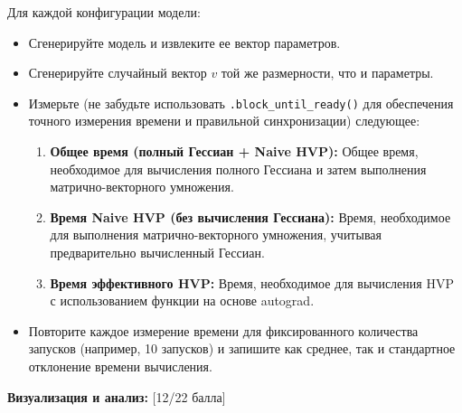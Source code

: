 \documentclass[
  russian,
  letterpaper,
  DIV=11,
  numbers=noendperiod]{scrartcl}
\providecommand{\tightlist}{%
  \setlength{\itemsep}{0pt}\setlength{\parskip}{0pt}}
\begin{document}
\begin{enumerate}
  Для каждой конфигурации модели:

  \begin{itemize}
  \tightlist
  \item
    Сгенерируйте модель и извлеките ее вектор параметров.
  \item
    Сгенерируйте случайный вектор \(v\) той же размерности, что и
    параметры.
  \item
    Измерьте (не забудьте использовать \texttt{.block\_until\_ready()}
    для обеспечения точного измерения времени и правильной
    синхронизации) следующее:

    \begin{enumerate}
    \def\labelenumii{\arabic{enumii}.}
    \tightlist
    \item
      \textbf{Общее время (полный Гессиан + Naive HVP):} Общее время,
      необходимое для вычисления полного Гессиана и затем выполнения
      матрично-векторного умножения.
    \item
      \textbf{Время Naive HVP (без вычисления Гессиана):} Время,
      необходимое для выполнения матрично-векторного умножения, учитывая
      предварительно вычисленный Гессиан.
    \item
      \textbf{Время эффективного HVP:} Время, необходимое для вычисления
      HVP с использованием функции на основе autograd.
    \end{enumerate}
  \item
    Повторите каждое измерение времени для фиксированного количества
    запусков (например, 10 запусков) и запишите как среднее, так и
    стандартное отклонение времени вычисления.
  \end{itemize}

  \textbf{Визуализация и анализ:} {[}12/22 балла{]}


\end{enumerate}
\end{document}

